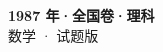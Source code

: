 \documentclass[zihao=-4, a4paper]{ctexart}
\begin{document}
\begin{center}
  {\Large\bfseries 1987 年·全国卷·理科}\\[4pt]
  {\large 数学 · 试题版}
\end{center}
\medskip
{}

\end{document}
